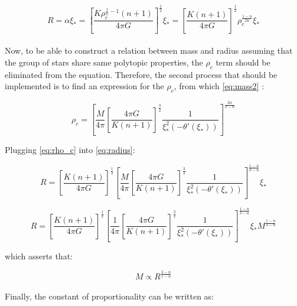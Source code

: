 \documentclass[letterpaper,12pt]{article}
\begin{document}
\begin{equation}
    \label{eq:radius}
    R = \alpha \xi_* = \left[\frac{K \rho_c^{\frac{1}{n}-1}\left(n+1\right)}{4 \pi G}\right]^{\frac{1}{2}}\xi_* = \left[\frac{K \left(n+1\right)}{4 \pi G}\right]^{\frac{1}{2}} \rho_c^{\frac{1-n}{2n}} \xi_*
\end{equation}

\paragraph{} Now, to be able to construct a relation between mass and radius assuming that the group of stars share same polytopic properties, the $\rho_c$ term should be eliminated from the equation. Therefore, the second process that should be implemented is to find an expression for the $\rho_c$, from which \eqref{eq:mass2} :

\begin{equation}
    \label{eq:rho_c}
    \rho_c = \left[\frac{M}{4 \pi} \left[\frac{4 \pi G}{K \left(n+1\right)}\right]^{\frac{3}{2}}  \frac{1}{\xi_*^2\left(-\theta'(\xi_*)\right)}\right]^{\frac{2n}{3-n}}
\end{equation}

Plugging \eqref{eq:rho_c} into \eqref{eq:radius}:

\begin{equation*}
    R = \left[\frac{K \left(n+1\right)}{4 \pi G}\right]^{\frac{1}{2}} \left[\frac{M}{4 \pi} \left[\frac{4 \pi G}{K \left(n+1\right)}\right]^{\frac{3}{2}}  \frac{1}{\xi_*^2\left(-\theta'(\xi_*)\right)}\right]^{\frac{1-n}{3-n}} \xi_* 
\end{equation*}

\begin{equation*}
    R =  \left[\frac{K \left(n+1\right)}{4 \pi G}\right]^{\frac{1}{2}} \left[\frac{1}{4 \pi} \left[\frac{4 \pi G}{K \left(n+1\right)}\right]^{\frac{3}{2}}  \frac{1}{\xi_*^2\left(-\theta'(\xi_*)\right)}\right]^{\frac{1-n}{3-n}} \xi_* M^{\frac{1-n}{3-n}} 
\end{equation*}

which asserts that:

\begin{equation*}
    M \propto R^{\frac{3-n}{1-n}}
\end{equation*}

\paragraph{} Finally, the constant of proportionality can be written as:
\end{document}
